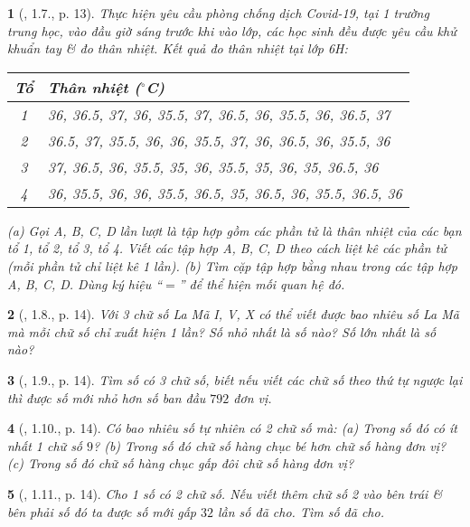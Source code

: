 \documentclass{article}
\newtheorem{baitoan}{}
\begin{document}
\begin{baitoan}[\cite{Binh_boi_duong_Toan_6_tap_1}, 1.7., p. 13]
	Thực hiện yêu cầu phòng chống dịch Covid-19, tại 1 trường trung học, vào đầu giờ sáng trước khi vào lớp, các học sinh đều được yêu cầu khử khuẩn tay \& đo thân nhiệt. Kết quả đo thân nhiệt tại lớp 6H:
	\begin{table}[H]
		\centering
		\begin{tabular}{|c|l|}
			\hline
			Tổ & Thân nhiệt (${}^\circ$C) \\
			\hline
			1 & 36, 36.5, 37, 36, 35.5, 37, 36.5, 36, 35.5, 36, 36.5, 37 \\
			\hline
			2 & 36.5, 37, 35.5, 36, 36, 35.5, 37, 36, 36.5, 36, 35.5, 36 \\
			\hline
			3 & 37, 36.5, 36, 35.5, 35, 36, 35.5, 35, 36, 35, 36.5, 36 \\
			\hline
			4 & 36, 35.5, 36, 36, 35.5, 36.5, 35, 36.5, 36, 35.5, 36.5, 36 \\
			\hline
		\end{tabular}
	\end{table}
	\noindent(a) Gọi A, B, C, D lần lượt là tập hợp gồm các phần tử là thân nhiệt của các bạn tổ 1, tổ 2, tổ 3, tổ 4. Viết các tập hợp A, B, C, D theo cách liệt kê các phần tử (mỗi phần tử chỉ liệt kê 1 lần). (b) Tìm cặp tập hợp bằng nhau trong các tập hợp A, B, C, D. Dùng ký hiệu ``$=$'' để thể hiện mối quan hệ đó.
\end{baitoan}

\begin{baitoan}[\cite{Binh_boi_duong_Toan_6_tap_1}, 1.8., p. 14]
	Với 3 chữ số La Mã I, V, X có thể viết được bao nhiêu số La Mã mà mỗi chữ số chỉ xuất hiện 1 lần? Số nhỏ nhất là số nào? Số lớn nhất là số nào?
\end{baitoan}

\begin{baitoan}[\cite{Binh_boi_duong_Toan_6_tap_1}, 1.9., p. 14]
	Tìm số có 3 chữ số, biết nếu viết các chữ số theo thứ tự ngược lại thì được số mới nhỏ hơn số ban đầu $792$ đơn vị.
\end{baitoan}

\begin{baitoan}[\cite{Binh_boi_duong_Toan_6_tap_1}, 1.10., p. 14]
	Có bao nhiêu số tự nhiên có 2 chữ số mà: (a) Trong số đó có ít nhất 1 chữ số $9$? (b) Trong số đó chữ số hàng chục bé hơn chữ số hàng đơn vị? (c) Trong số đó chữ số hàng chục gấp đôi chữ số hàng đơn vị?
\end{baitoan}

\begin{baitoan}[\cite{Binh_boi_duong_Toan_6_tap_1}, 1.11., p. 14]
	Cho 1 số có 2 chữ số. Nếu viết thêm chữ số 2 vào bên trái \& bên phải số đó ta được số mới gấp $32$ lần số đã cho. Tìm số đã cho.
\end{baitoan}
\end{document}
